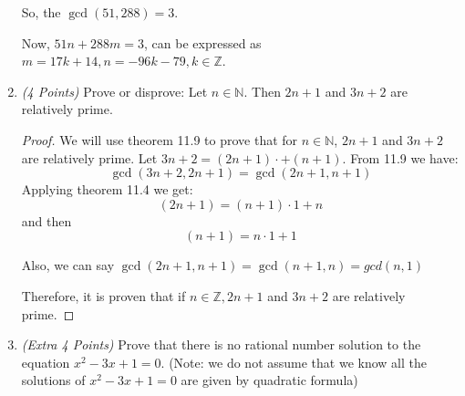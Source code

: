 \documentclass[10pt]{article} %
\newcommand{\N}{\mathbb{N}}
\newcommand{\Z}{\mathbb{Z}}
\newcommand{\points}[1]{{\it (#1 Points)}}
\begin{document}
\begin{enumerate}
So, the $\gcd(51,288) = 3$.  

Now, $51n + 288m = 3$, can be expressed as $m = 17k + 14, n = -96k - 79, k \in \Z$.  

\bigskip

\item\points{4} Prove or disprove: Let $n\in \N$. Then $2n+1$ and $3n+2$ are relatively prime.

\bigskip

\begin{proof} We will use theorem 11.9 to prove that for $n\in \N$, $2n+1$ and $3n+2$ are relatively prime.  Let $3n+2 = (2n+1) \cdot + (n+1)$.  From 11.9 we have: $$\gcd(3n+2,2n+1) = \gcd(2n+1,n+1)$$
Applying theorem 11.4 we get: $$(2n+1) = (n+1) \cdot 1 + n$$ and then $$(n+1) = n \cdot 1 + 1$$

Also, we can say $\gcd(2n+1,n+1) = \gcd(n+1,n) = gcd(n,1)$

Therefore, it is proven that if $n \in \Z, 2n+1$ and $3n+2$ are relatively prime.  
\end{proof}

\bigskip


\item \points{Extra 4} Prove that there is no rational number solution to the equation $x^2-3x+1=0$.
    (Note: we do not assume that we know all the solutions of $x^2-3x+1=0$ are given by quadratic formula)

\end{enumerate}
\end{document}

